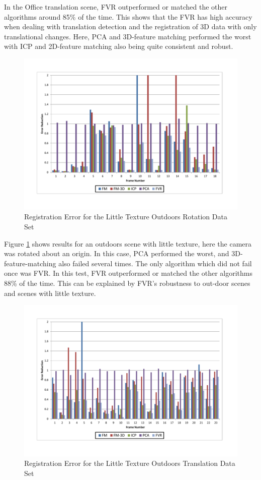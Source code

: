 In the Office translation scene, FVR outperformed or matched the other algorithms around 85\% of the time. This shows that the FVR has high accuracy when dealing with translation detection and the registration of 3D data with only translational changes. Here, PCA and 3D-feature matching performed the worst with ICP and 2D-feature matching also being quite consistent and robust.

\begin{figure}[t]
\centering
\includegraphics[width=6.0in]{images/results/Outside_No_Texture_Rotation}
\caption{Registration Error for the Little Texture Outdoors Rotation Data Set}
\label{fig:PET13}
\end{figure}

Figure \ref{fig:PET13} shows results for an outdoors scene with little texture, here the camera was rotated about an origin. In this case, PCA performed the worst, and 3D-feature-matching also failed several times. The only algorithm which did not fail once was FVR. In this test, FVR outperformed or matched the other algorithms 88\% of the time. This can be explained by FVR's robustness to out-door scenes and scenes with little texture. 

\begin{figure}[t]
\centering
\includegraphics[width=6.0in]{images/results/Outside_No_Texture_Translation}
\caption{Registration Error for the Little Texture Outdoors Translation Data Set}
\label{fig:PET14}
\end{figure}

